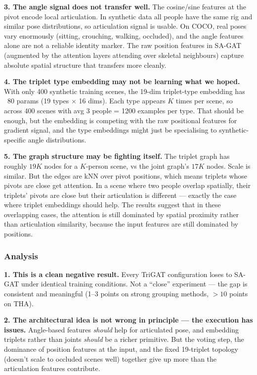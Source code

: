 \textbf{3. The angle signal does not transfer well.} The cosine/sine features at the pivot encode local articulation. In synthetic data all people have the same rig and similar pose distributions, so articulation signal is usable. On COCO, real poses vary enormously (sitting, crouching, walking, occluded), and the angle features alone are not a reliable identity marker. The raw position features in SA-GAT (augmented by the attention layers attending over skeletal neighbours) capture absolute spatial structure that transfers more cleanly.

\textbf{4. The triplet type embedding may not be learning what we hoped.} With only 400 synthetic training scenes, the 19-dim triplet-type embedding has ~80 params (19 types $\times$ 16 dims). Each type appears $K$ times per scene, so across 400 scenes with avg 3 people = 1200 examples per type. That should be enough, but the embedding is competing with the raw positional features for gradient signal, and the type embeddings might just be specialising to synthetic-specific angle distributions.

\textbf{5. The graph structure may be fighting itself.} The triplet graph has roughly $19K$ nodes for a $K$-person scene, vs the joint graph's $17K$ nodes. Scale is similar. But the edges are kNN over pivot positions, which means triplets whose pivots are close get attention. In a scene where two people overlap spatially, their triplets' pivots are close but their articulation is different --- exactly the case where triplet embeddings should help. The results suggest that in these overlapping cases, the attention is still dominated by spatial proximity rather than articulation similarity, because the input features are still dominated by positions.

\subsubsection{Analysis}

\textbf{1. This is a clean negative result.} Every TriGAT configuration loses to SA-GAT under identical training conditions. Not a ``close'' experiment --- the gap is consistent and meaningful (1--3 points on strong grouping methods, $>10$ points on THA).

\textbf{2. The architectural idea is not wrong in principle --- the execution has issues.} Angle-based features \emph{should} help for articulated pose, and embedding triplets rather than joints \emph{should} be a richer primitive. But the voting step, the dominance of position features at the input, and the fixed 19-triplet topology (doesn't scale to occluded scenes well) together give up more than the articulation features contribute.

